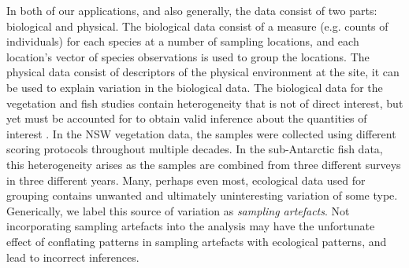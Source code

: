 \documentclass{statsoc}
\begin{document}
In both of our applications, and also generally, the data consist of two parts: biological and physical. The biological data consist of a measure (e.g. counts of individuals) for each species at a number of sampling locations, and each location's vector of species observations is used to group the locations. The physical data consist of descriptors of the physical environment at the site, it can be used to explain variation in the biological data. The biological data for the vegetation and fish studies contain heterogeneity that is not of direct interest, but yet must be accounted for to obtain valid inference about the quantities of interest \citep[e.g.][]{gel13}. In the NSW vegetation data, the samples were collected using different scoring protocols throughout multiple decades. In the sub-Antarctic fish data, this heterogeneity arises as the samples are combined from three different surveys in three different years. Many, perhaps even most, ecological data used for grouping contains unwanted and ultimately uninteresting variation of some type. Generically, we label this source of variation as \textit{sampling artefacts}. Not incorporating sampling artefacts into the analysis may have the unfortunate effect of conflating patterns in sampling artefacts with ecological patterns, and lead to incorrect inferences. %
\end{document}
